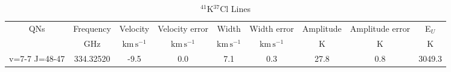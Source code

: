 \begin{table*}[htp]
\centering
\caption{$^{41}$K$^{37}$Cl Lines}
\begin{tabular}{ccccccccc}
\label{tab:41K37Cl_salt_lines}
QNs & Frequency & Velocity & Velocity error & Width & Width error & Amplitude & Amplitude error & E$_U$ \\
 & $\mathrm{GHz}$ & $\mathrm{km\,s^{-1}}$ & $\mathrm{km\,s^{-1}}$ & $\mathrm{km\,s^{-1}}$ & $\mathrm{km\,s^{-1}}$ & $\mathrm{K}$ & $\mathrm{K}$ & $\mathrm{K}$ \\
\hline
v=7-7 J=48-47 & 334.32520 & -9.5 & 0.0 & 7.1 & 0.3 & 27.8 & 0.8 & 3049.3 \\
\hline
\end{tabular}

\par 
\end{table*}
